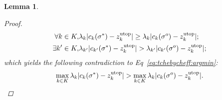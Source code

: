 \documentclass{article}
\newtheorem{lem}{Lemma}
\begin{document}
\begin{lem}
\begin{proof}
\begin{eqnarray}
\nonumber
\forall k \in K , & \lambda_{k} | c_{k}( \sigma^{*} ) - z^{\rm utop}_{k} | \geq \lambda_{k}  | c_{k}( \sigma^{o} ) - z^{\rm utop}_{k} | ; \\
\nonumber
\exists k' \in K , & \lambda_{k'}  | c_{k'}( \sigma^{*} ) - z^{\rm utop}_{k} | > \lambda_{k'}  | c_{k'}( \sigma^{o} ) - z^{\rm utop}_{k} | ;
\end{eqnarray}
which yields the following contradiction to Eq~\eqref{eq:tchebycheff:argmin}:
\begin{equation}
\nonumber
\max_{ k \in K }  \lambda_{k} | c_{k}( \sigma^{*} ) - z^{\rm utop}_{k} | > \max_{ k \in K } \lambda_{k}  | c_{k}( \sigma^{o} ) - z^{\rm utop}_{k} |.
\end{equation}
\end{proof}
\end{lem}
\end{document}
